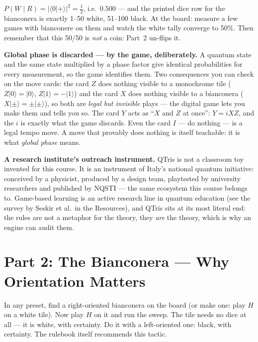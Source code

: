\documentclass[a4paper,11pt]{article}
\providecommand{\ket}[1]{|#1\rangle}
\providecommand{\braket}[2]{\langle#1|#2\rangle}
\begin{document}
\begin{numberbox}
$P(W \mid R) = |\braket{0}{+}|^2 = \tfrac12$, i.e.\ $0.500$ --- and the printed dice
row for the bianconera is exactly 1--50 white, 51--100 black. At the board: measure a
few games with bianconere on them and watch the white tally converge to 50\%. Then
remember that this 50/50 is \emph{not} a coin: Part~2 un-flips it.
\end{numberbox}

\begin{theorybox}
\textbf{Global phase is discarded --- by the game, deliberately.} A quantum state and
the same state multiplied by a phase factor give identical probabilities for every
measurement, so the game identifies them. Two consequences you can check on the move
cards: the card $Z$ does nothing visible to a monochrome tile ($Z\ket{0} = \ket{0}$,
$Z\ket{1} = -\ket{1}$) and the card $X$ does nothing visible to a bianconera
($X\ket{\pm} = \pm\ket{\pm}$), so both are \emph{legal but invisible} plays --- the
digital game lets you make them and tells you so. The card $Y$ acts as ``$X$ and $Z$
at once'': $Y = iXZ$, and the $i$ is exactly what the game discards. Even the card $I$
--- do nothing --- is a legal tempo move. A move that provably does nothing is itself
teachable: it is what \emph{global phase} means.
\end{theorybox}

\begin{industrybox}
\textbf{A research institute's outreach instrument.} QTris is not a classroom toy
invented for this course. It is an instrument of Italy's national quantum initiative:
conceived by a physicist, produced by a design team, playtested by university
researchers and published by NQSTI --- the same ecosystem this course belongs to.
Game-based learning is an active research line in quantum education (see the survey by
Seskir et al.\ in the Resources), and QTris sits at its most literal end: the rules are
not a metaphor for the theory, they \emph{are} the theory, which is why an engine can
audit them.
\end{industrybox}

\section{Part 2: The Bianconera --- Why Orientation Matters}

\begin{playbox}
In any preset, find a right-oriented bianconera on the board (or make one: play $H$ on
a white tile). Now play $H$ on it and run the sweep. The tile needs no dice at all ---
it is white, with certainty. Do it with a left-oriented one: black, with certainty.
The rulebook itself recommends this tactic.
\end{playbox}
\end{document}
